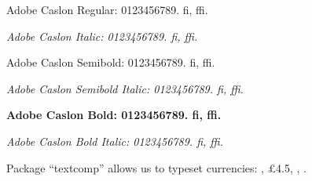 \documentclass{article}
\begin{document}
\adobecaslonfamily

Adobe Caslon Regular: 0123456789. fi, ffi. \lipsum[1]

{\itshape Adobe Caslon Italic: 0123456789. fi, ffi. \lipsum[2]}

{\sbseries
Adobe Caslon Semibold: 0123456789. fi, ffi. \lipsum[3]

\itshape Adobe Caslon Semibold Italic: 0123456789. fi, ffi. \lipsum[4]}


{\bfseries
Adobe Caslon Bold: 0123456789. fi, ffi. \lipsum[5]

\itshape Adobe Caslon Bold Italic: 0123456789. fi, ffi. \lipsum[6]}


Package ``textcomp'' allows us to typeset currencies: ,
\pounds4.5, , .
\end{document}

